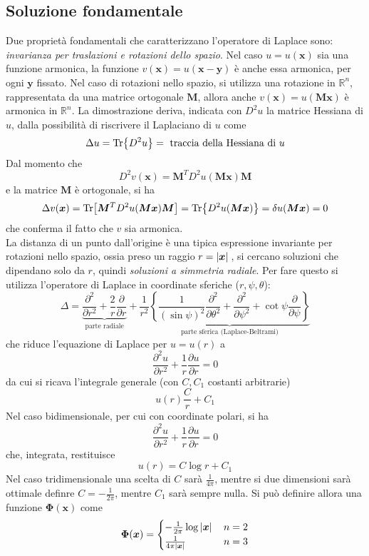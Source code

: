 \documentclass[a4paper,12pt, draft]{article}
\theoremstyle{break}
\numberwithin{equation}{section}
\begin{document}
\subsection{Soluzione fondamentale}
Due proprietà fondamentali che caratterizzano l'operatore di Laplace sono: \emph{invarianza per traslazioni e rotazioni dello spazio}. Nel caso \(u = u(\bm{x})\) sia una funzione armonica, la funzione \(v(\bm{x}) = u(\bm{x} - \bm{y})\) è anche essa armonica, per ogni \(\bm{y}\) fissato. Nel caso di rotazioni nello spazio, si utilizza una rotazione in \(\mathbb{R}^n\), rappresentata da una matrice ortogonale \(\bm{M}\), allora anche \(v(\bm{x}) = u(\bm{Mx})\) è armonica in \(\mathbb{R}^n\). 
La dimostrazione deriva, indicata con \(D^2 u\) la matrice Hessiana di \(u\), dalla possibilità di riscrivere il Laplaciano di \(u\) come
\[
  \Delta u = \Tr{D^2u} = \mbox{ traccia della Hessiana di }u 
\]
Dal momento che 
\[
  D^2v(\bm{x}) = \bm{M}^T D^2u(\bm{Mx})\bm{M}
\]
e la matrice \(\bm{M}\) è ortogonale, si ha 
\[
  \Delta v(\bm{x}) = \Tr[\bm{M}^T D^2u(\bm{Mx})\bm{M}] = \Tr{D^2u(\bm{Mx})} = \delta u(\bm{Mx}) = 0
\]
che conferma il fatto che \(v\) sia armonica. \\
La distanza di un punto dall'origine è una tipica espressione invariante per rotazioni nello spazio, ossia preso un raggio \(r = \abs*{\bm{x}}\), si cercano soluzioni che dipendano solo da \(r\), quindi \emph{soluzioni a simmetria radiale}.
Per fare questo si utilizza l'operatore di Laplace in coordinate sferiche (\(r, \psi, \theta\)):
\[
  \Delta = \underbrace{\frac{\partial^2}{\partial r^2} + \frac{2}{r} \frac{\partial}{\partial r}}_{\text{parte radiale}} + \frac{1}{r^2} \underbrace{\left\{ \frac{1}{(\sin\psi)^2} \frac{\partial^2}{\partial \theta^2} + \frac{\partial^2}{\partial \psi^2} + \cot{\psi \frac{\partial}{\partial \psi}}\right\}}_{\text{parte sferica (Laplace-Beltrami)}}
\]
che riduce l'equazione di Laplace per \(u = u(r)\) a 
\[
  \frac{\partial^2 u}{\partial r^2} + \frac{1}{r} \frac{\partial u}{\partial r} = 0
\]
da cui si ricava l'integrale generale (con \(C, C_1\) costanti arbitrarie)
\[
u(r) \frac{C}{r}+ C_1  
\]
Nel caso bidimensionale, per cui con coordinate polari, si ha 
\[
  \frac{\partial^2 u}{\partial r^2} + \frac{1}{r} \frac{\partial u}{\partial r} = 0
\]
che, integrata, restituisce
\[
  u(r) = C\log{r} + C_1
\]
Nel caso tridimensionale una scelta di \(C\) sarà \(\frac{1}{4\pi}\), mentre si due dimensioni sarà ottimale definre \(C = -\frac{1}{2\pi}\), mentre \(C_1\) sarà sempre nulla.
Si può definire allora una funzione \(\bm{\Phi}(\bm{x})\) come
\begin{equation}
  \bm{\Phi}(\bm{x}) = \begin{cases}
    -\frac{1}{2\pi} \log{\abs*{\bm{x}}} & n = 2 \\
    \frac{1}{4\pi \abs*{\bm{x}}} & n = 3
  \end{cases}
\end{equation}
\end{document}
